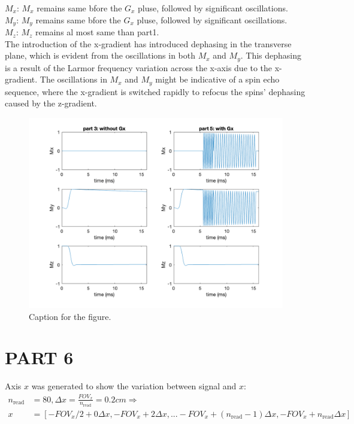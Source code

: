 \documentclass{report}
\begin{document}
$M_x$: $M_x$ remains same bfore the $G_x$ pluse, followed by significant oscillations.\\
$M_y$: $M_y$ remains same bfore the $G_x$ pluse, followed by significant oscillations.\\
$M_z$: $M_z$ remains al most same than part1.\\

The introduction of the x-gradient has introduced dephasing in the transverse plane, which is evident 
from the oscillations in both $M_x$ and $M_y$. This dephasing is a result of the Larmor frequency 
variation across the x-axis due to the x-gradient. The oscillations in $M_x$ and $M_y$ might be indicative of
 a spin echo sequence, where the x-gradient is switched rapidly to refocus the spins' dephasing caused by the z-gradient.
\begin{figure}[hb]
    \centering
    \includegraphics[width=1\textwidth]{5.png}
    \caption{Caption for the figure.}
\end{figure}
\newpage 
\section[short]{PART 6}
Axis $x$ was generated to show the variation between signal and $x$:
\begin{align*}
n_{\text{read}} &= 80, \Delta x = \frac{FOV_x}{n_{\text{read}}} = 0.2cm \Rightarrow \\
x &= [-FOV_x/2 + 0 \Delta x, -FOV_x + 2 \Delta x, ... -FOV_x + (n_{\text{read}} - 1) \Delta x, -FOV_x + n_{\text{read}} \Delta x]\\
\end{align*}
\end{document}
